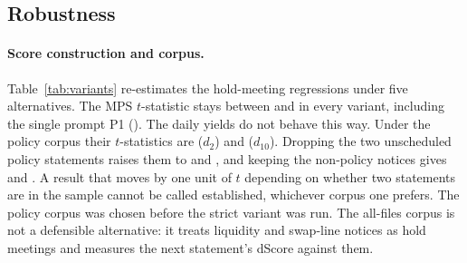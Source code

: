 \subsection{Robustness}\label{sec:robust}

\begin{table}[t]
\centering
\caption{Hold-meeting $t$-statistics under other score constructions and corpora}\label{tab:variants}
\footnotesize
\setlength{\tabcolsep}{4pt}

\end{table}

\paragraph{Score construction and corpus.} Table~\ref{tab:variants} re-estimates the hold-meeting
regressions under five alternatives. The MPS $t$-statistic stays between  and
 in every variant, including the single prompt P1 (). The daily
yields do not behave this way. Under the policy corpus their $t$-statistics are 
($d_2$) and  ($d_{10}$). Dropping the two unscheduled policy statements raises them to
 and , and keeping the non-policy notices gives
 and . A result that moves by one unit of $t$ depending on whether two
statements are in the sample cannot be called established, whichever corpus one prefers. The policy
corpus was chosen before the strict variant was run. The all-files corpus is not a defensible
alternative: it treats liquidity and swap-line notices as hold meetings and measures the next
statement's dScore against them.

\begin{table}[t]
\centering
\caption{Placebo days for the daily yield regressions}\label{tab:placebo}
\small

\end{table}

